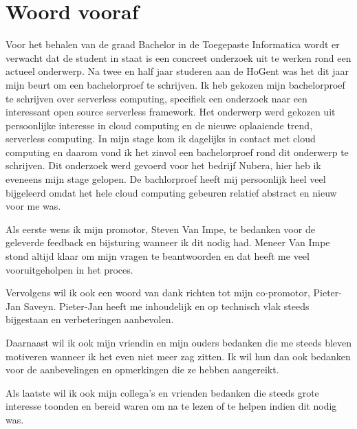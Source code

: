 
\chapter*{Woord vooraf}
\label{ch:voorwoord}

Voor het behalen van de graad Bachelor in de Toegepaste Informatica wordt er verwacht dat de student in staat is een concreet onderzoek uit te werken rond een actueel onderwerp. Na twee en half jaar studeren aan de HoGent was het dit jaar mijn beurt om een bachelorproef te schrijven. Ik heb gekozen mijn bachelorproef te schrijven over serverless computing, specifiek een onderzoek naar een interessant open source serverless framework. Het onderwerp werd gekozen uit persoonlijke interesse in cloud computing en de nieuwe oplaaiende trend, serverless computing. In mijn stage kom ik dagelijks in contact met cloud computing en daarom vond ik het zinvol een bachelorproef rond dit onderwerp te schrijven. Dit onderzoek werd gevoerd voor het bedrijf Nubera, hier heb ik eveneens mijn stage gelopen. De bachlorproef heeft mij persoonlijk heel veel bijgeleerd omdat het hele cloud computing gebeuren relatief abstract en nieuw voor me was. 

Als eerste wens ik mijn promotor, Steven Van Impe, te bedanken voor de geleverde feedback en bijsturing wanneer ik dit nodig had. Meneer Van Impe stond altijd klaar om mijn vragen te beantwoorden en dat heeft me veel vooruitgeholpen in het proces.

Vervolgens wil ik ook een woord van dank richten tot mijn co-promotor, Pieter-Jan Saveyn. Pieter-Jan heeft me inhoudelijk en op technisch vlak steeds bijgestaan en verbeteringen aanbevolen.

Daarnaast wil ik ook mijn vriendin en mijn ouders bedanken die me steeds bleven motiveren wanneer ik het even niet meer zag zitten. Ik wil hun dan ook bedanken voor de aanbevelingen en opmerkingen die ze hebben aangereikt.

Als laatste wil ik ook mijn collega's en vrienden bedanken die steeds grote interesse toonden en bereid waren om na te lezen of te helpen indien dit nodig was.
